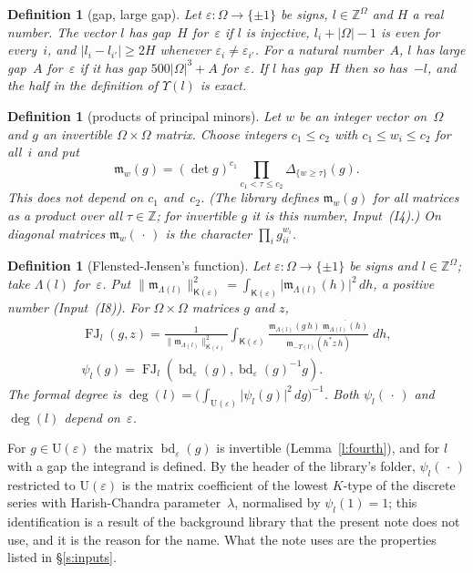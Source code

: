 \documentclass[11pt,a4paper]{article}
\newcommand{\kw}[1]{\emph{#1}}
\newcommand{\m}[1]{\mbox{$#1$}}        %
\theoremstyle{plainx}
\theoremstyle{uprightx}
\newtheorem{definition}[theorem]{Definition}
\newcommand{\ZZ}{\mathbb{Z}}
\newcommand{\abs}[1]{\lvert #1\rvert}
\newcommand{\Us}[1]{\mathrm{U}(#1)}                      %
\newcommand{\Ks}[1]{\mathsf{K}(#1)}                      %
\newcommand{\bd}[2]{\operatorname{bd}_{#1}(#2)}          %
\newcommand{\pmn}[2]{\Delta_{#1}(#2)}                    %
\newcommand{\lowk}[1]{\Lambda(#1)}                       %
\newcommand{\ups}[1]{\Upsilon(#1)}                       %
\newcommand{\dsc}[2]{\psi_{#1}(#2)}                      %
\newcommand{\fj}[3]{\operatorname{FJ}_{#1}(#2,#3)}       %
\newcommand{\wm}[2]{\mathfrak{m}_{#1}(#2)}               %
\newcommand{\ktn}[2]{\lVert\mathfrak{m}_{#2}\rVert^{2}_{\mathsf{K}(#1)}}   %
\newcommand{\fdeg}[1]{\deg(#1)}                          %
\newcommand{\inp}[1]{\textup{(I#1)}}
\begin{document}
\begin{definition}[gap, large gap]\label{d:gap}
Let $\varepsilon\colon\Omega\to\{\pm1\}$ be signs, \m{l\in\ZZ^{\Omega}} and $H$ a real number. The vector $l$
\kw{has gap~$H$ for~$\varepsilon$} if $l$ is injective, \m{l_i+\abs{\Omega}-1} is even for every~$i$, and
\m{\abs{l_i-l_{i'}}\ge2H} whenever $\varepsilon_i\ne\varepsilon_{i'}$. For a natural number~$A$, $l$ \kw{has large
gap~$A$ for~$\varepsilon$} if it has gap \m{500\abs{\Omega}^{3}+A} for~$\varepsilon$. If $l$ has gap~$H$ then so
has~$-l$, and the half in the definition of $\ups{l}$ is exact.
\end{definition}

\begin{definition}[products of principal minors]\label{d:wm}
Let $w$ be an integer vector on~$\Omega$ and $g$ an invertible \m{\Omega\times\Omega} matrix. Choose integers
\m{c_1\le c_2} with \m{c_1\le w_i\le c_2} for all~$i$ and put
\[\wm{w}{g}=(\det g)^{c_1}\prod_{c_1<\tau\le c_2}\pmn{\{w\ge\tau\}}{g}.\]
This does not depend on $c_1$ and~$c_2$. (The library defines $\wm{w}{g}$ for all matrices as a product over all
\m{\tau\in\ZZ}; for invertible $g$ it is this number, Input~\inp{4}.) On diagonal matrices $\wm{w}{\,\cdot\,}$ is the
character \m{\prod_i g_{ii}^{w_i}}.
\end{definition}

\begin{definition}[Flensted-Jensen's function]\label{d:coeff}
Let $\varepsilon\colon\Omega\to\{\pm1\}$ be signs and \m{l\in\ZZ^{\Omega}}; take $\lowk{l}$ for~$\varepsilon$. Put
$\ktn{\varepsilon}{\lowk{l}}=\int_{\Ks{\varepsilon}}\abs{\wm{\lowk{l}}{h}}^{2}\,dh$, a positive number
(Input~\inp{8}). For \m{\Omega\times\Omega} matrices $g$ and $z$,
\[\begin{gathered}\fj{l}{g}{z}=\frac{1}{\ktn{\varepsilon}{\lowk{l}}}\int_{\Ks{\varepsilon}}
\frac{\wm{\lowk{l}}{g\,h}\;\overline{\wm{\lowk{l}}{h}}}{\wm{-\ups{l}}{h^{*}z\,h}}\;dh,\\
\dsc{l}{g}=\fj{l}{\bd{\varepsilon}{g}}{\bd{\varepsilon}{g}^{-1}g}.\end{gathered}\]
The \kw{formal degree} is $\fdeg{l}=\bigl(\int_{\Us{\varepsilon}}\abs{\dsc{l}{g}}^{2}\,dg\bigr)^{-1}$. Both
$\dsc{l}{\,\cdot\,}$ and $\fdeg{l}$ depend on~$\varepsilon$.
\end{definition}

For \m{g\in\Us{\varepsilon}} the matrix $\bd{\varepsilon}{g}$ is invertible (Lemma~\ref{l:fourth}), and for $l$ with
a gap the integrand is defined. By the header of the library's folder, $\dsc{l}{\,\cdot\,}$ restricted to
$\Us{\varepsilon}$ is the matrix coefficient of the lowest $K$-type of the discrete series with Harish-Chandra
parameter~$\lambda$, normalised by \m{\dsc{l}{1}=1}; this identification is a result of the background library that
the present note does not use, and it is the reason for the name. What the note uses are the properties listed in
§\ref{s:inputs}.
\end{document}

